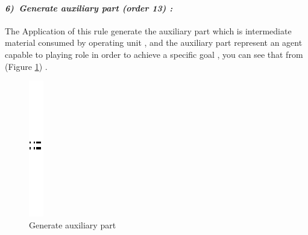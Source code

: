 \paragraph{\emph{6)~Generate auxiliary part  (order 13) :} }
 
 
The Application of this rule generate the auxiliary part which is intermediate material consumed by operating unit , and the auxiliary part represent an agent capable to playing role in order to achieve a specific goal , you can see that from (Figure \ref{fig:Generate auxiliary part}) .
\vspace{1cm}
\begin{figure}[th]
\centering 

\quad{}
\includegraphics{Chapiter3/img/sep}
\quad{}


\caption{\label{fig:Generate auxiliary part} Generate auxiliary part}
 
\end{figure}
\vspace{1cm}




